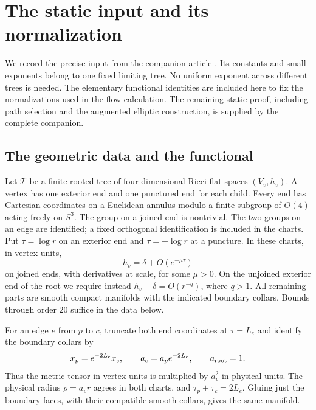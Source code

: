 \section{The static input and its normalization}
\label{sec:static-input}

We record the precise input from the companion article
\cite[Theorem~2.2]{StaticTrees}. Its constants and small exponents
belong to one fixed limiting tree. No uniform exponent across different
trees is needed. The elementary functional identities are included here
to fix the normalizations used in the flow calculation.
The remaining static proof, including path selection and the augmented
elliptic construction, is supplied by the complete companion.

\subsection{The geometric data and the functional}
\label{ell:setup}

Let $\mathcal T$ be a finite rooted tree of four-dimensional Ricci-flat
spaces $(V_v,h_v)$.  A vertex has one exterior end and one punctured end
for each child.  Every end has Cartesian coordinates on a Euclidean
annulus modulo a finite subgroup of $O(4)$ acting freely on $S^3$.
The group on a joined end is nontrivial.  The two groups on an edge
are identified; a fixed orthogonal identification is included in the
charts.  Put $\tau=\log r$ on an exterior end and $\tau=-\log r$ at a
puncture.  In these charts, in vertex units,
\begin{equation}
 h_v=\delta+O(e^{-\mu\tau})
 \label{ell:end-decay}
\end{equation}
on joined ends, with derivatives at scale, for some $\mu>0$.
On the unjoined exterior end of the root we require instead
$h_v-\delta=O(r^{-q})$, where $q>1$.
All remaining parts are smooth compact manifolds with the indicated
boundary collars.  Bounds through order $20$ suffice in the data below.

For an edge $e$ from $p$ to $c$, truncate both end coordinates at
$\tau=L_e$ and identify the boundary collars by
\begin{equation}
 x_p=e^{-2L_e}x_c,\qquad a_c=a_p e^{-2L_e},\qquad a_{\rm root}=1.
 \label{ell:scales}
\end{equation}
Thus the metric tensor in vertex units is multiplied by $a_v^2$ in
physical units.  The physical radius $\rho=a_vr$ agrees in both charts,
and $\tau_p+\tau_c=2L_e$.  Gluing just the boundary faces, with their
compatible smooth collars, gives the same manifold.

